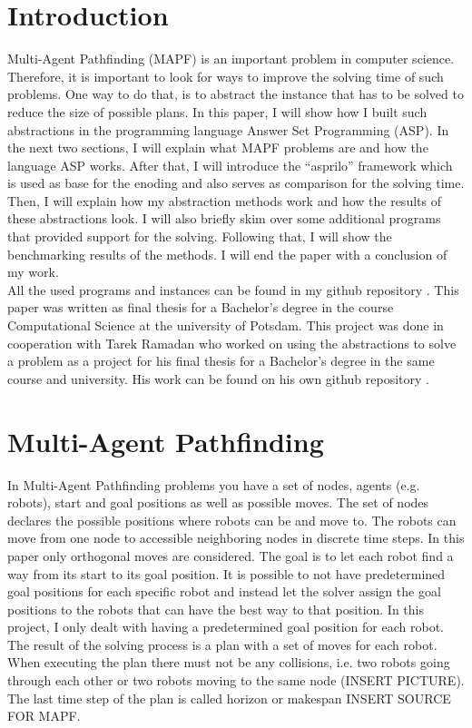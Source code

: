 \documentclass[runningheads]{llncs}
\begin{document}
\section{Introduction}
Multi-Agent Pathfinding (MAPF) is an important problem in computer science. Therefore, it is important to look for ways to improve the solving time of such problems. One way to do that, is to abstract the instance that has to be solved to reduce the size of
possible plans. In this paper, I will show how I built such abstractions in the programming language Answer Set Programming (ASP). In the next two sections, I will explain what MAPF problems are and how the language ASP works. After that, I will introduce the ``asprilo'' framework which is used as base for the enoding and also serves as comparison for the solving time. Then, I will explain how my abstraction methods work and how the results of these abstractions look. I will also briefly skim over some additional programs that provided support for the solving. Following that, I will show the benchmarking results of the methods. I will end the paper with a conclusion of my work. \\
All the used programs and instances can be found in my github repository \cite{my-git}. This paper was written as final thesis for a Bachelor's degree in the course Computational Science at the university of Potsdam. This project was done in cooperation with Tarek Ramadan who worked on using the abstractions to solve a problem as a project for his final thesis for a Bachelor's degree in the same course and university. His work can be found on his own github repository \cite{tarek-git}.

\section{Multi-Agent Pathfinding}
In Multi-Agent Pathfinding problems you have a set of nodes, agents (e.g. robots), start and goal positions as well as possible moves. The set of nodes declares the possible positions where robots can be and move to. The robots can move from one node to accessible neighboring nodes in discrete time steps. In this paper only orthogonal moves are considered. The goal is to let each robot find a way from its start to its goal position. It is possible to not have predetermined goal positions for each specific robot and instead let the solver assign the goal positions to the robots that can have the best way to that position. In this project, I only dealt with having a predetermined goal position for each robot. The result of the solving process is a plan with a set of moves for each robot. When executing the plan there must not be any collisions, i.e. two robots going through each other or two robots moving to the same node (INSERT PICTURE). The last time step of the plan is called horizon or makespan INSERT SOURCE FOR MAPF. 
\end{document}
